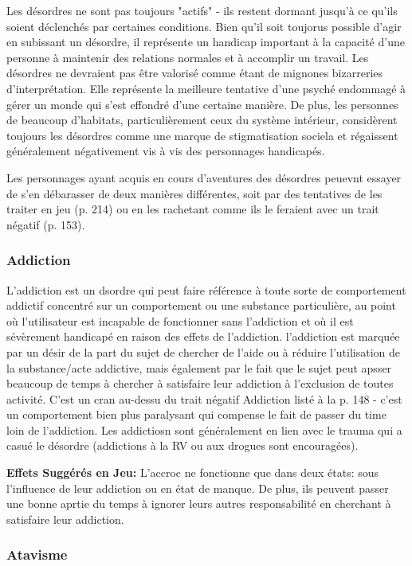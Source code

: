 Les désordres ne sont pas toujours "actifs" - ils restent dormant jusqu'à ce qu'ils soient déclenchés par certaines conditions. Bien qu'il soit toujorus possible d'agir en subissant un désordre, il représente un handicap important à la capacité d'une personne à maintenir des relations normales et à accomplir un travail. Les désordres ne devraient pas être valorisé comme étant de mignones bizarreries d'interprétation. Elle représente la meilleure tentative d'une psyché endommagé à gérer un monde qui s'est effondré d'une certaine manière. De plus, les personnes de beaucoup d'habitats, particulièrement ceux du système intérieur, considèrent toujours les désordres comme une marque de stigmatisation sociela et régaissent généralement négativement vis à vis des personnages handicapés. 

Les personnages ayant acquis en cours d'aventures des désordres peuevnt essayer de s'en débarasser de deux manières différentes, soit par des tentatives de les traiter en jeu (p. 214) ou en les rachetant comme ils le feraient avec un trait négatif (p. 153). 

\subsubsection{Addiction} 

L'addiction est un dsordre qui peut faire référence à toute sorte de comportement addictif concentré sur un comportement ou une substance particulière, au point où l'utilisateur est incapable de fonctionner sans l'addiction et où il est sévèrement handicapé en raison des effets de l'addiction. l'addiction est marquée par un désir de la part du sujet de chercher de l'aide ou à réduire l'utilisation de la substance/acte addictive, mais également par le fait que le sujet peut apsser beaucoup de temps à chercher à satisfaire leur addiction à l'exclusion de toutes activité. C'est un cran au-dessu du trait négatif Addiction listé à la p. 148 - c'est un comportement bien plus paralysant qui compense le fait de passer du time loin de l'addiction. Les addictiosn sont généralement en lien avec le trauma qui a casué le désordre (addictions à la RV ou aux drogues sont encouragées). 

\textbf{Effets Suggérés en  Jeu:} L'accroc ne fonctionne que dans deux états: sous l'influence de leur addiction ou en état de manque. De plus, ils peuvent passer une bonne aprtie du temps à ignorer leurs autres responsabilité en cherchant à satisfaire leur addiction. 

\subsubsection{Atavisme} 

